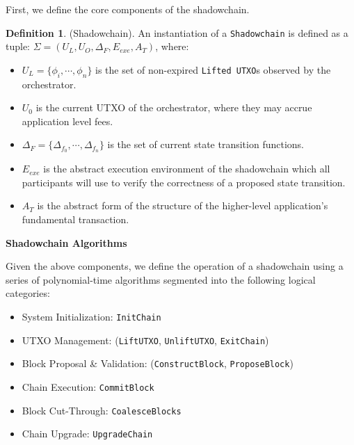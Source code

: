 \documentclass[10pt,a4paper]{article}
\theoremstyle{definition}
\newtheorem{definition}{Definition}[section]
\begin{document}
First, we define the core components of the shadowchain.

\begin{definition}{(Shadowchain).} An instantiation of a \texttt{Shadowchain}
    is defined as a tuple: $\Sigma = (U_{L}, U_{O}, \Delta_F, E_{exe},
    A_{T})$, where:
\end{definition}

\begin{itemize}
    \item $U_{L} = \{\phi_i, \cdots, \phi_n\}$ is the set of non-expired
        \texttt{Lifted UTXO}s observed by the orchestrator.

    \item $U_{0}$ is the current UTXO of the orchestrator, where they may
        accrue application level fees.

    \item $\Delta_F =  \{ \Delta_{f_0}, \cdots, \Delta_{f_n} \}$ is the set of
        current state transition functions.

    \item $E_{exe}$ is the abstract execution environment of the shadowchain
        which all participants will use to verify the correctness of a proposed
        state transition.

    \item $A_{T}$ is the abstract form of the structure of the higher-level
        application's fundamental transaction.

\end{itemize}

\begin{center}
    \textbf{Shadowchain Algorithms}
\end{center}

Given the above components, we define the operation of a shadowchain using a
series of polynomial-time algorithms segmented into the following logical
categories:

\begin{itemize}
    \item System Initialization: \texttt{InitChain}
    \item UTXO Management: (\texttt{LiftUTXO}, \texttt{UnliftUTXO}, \texttt{ExitChain})
    \item Block Proposal \& Validation: (\texttt{ConstructBlock}, \texttt{ProposeBlock})
    \item Chain Execution: \texttt{CommitBlock}
    \item Block Cut-Through: \texttt{CoalesceBlocks}
    \item Chain Upgrade: \texttt{UpgradeChain}
\end{itemize}
\end{document}
